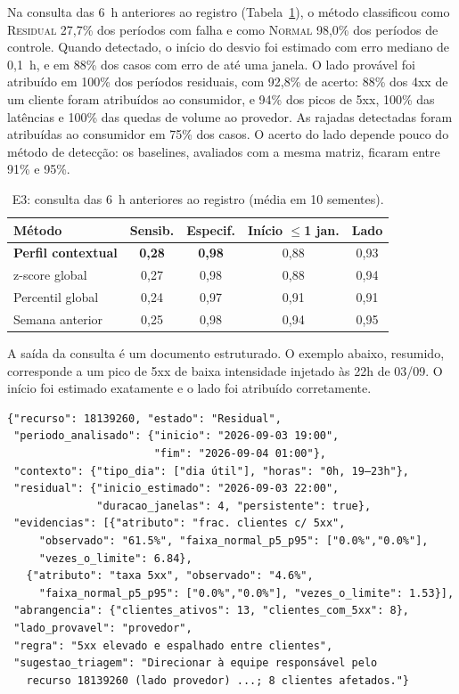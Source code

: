 \documentclass[sigconf,nonacm]{acmart}
\newcommand{\Normal}{\textsc{Normal}\xspace}
\newcommand{\Residual}{\textsc{Residual}\xspace}
\begin{document}
Na consulta das 6~h anteriores ao registro (Tabela~\ref{tab:consultas}), o método classificou como \Residual 27,7\% dos períodos com falha e como \Normal 98,0\% dos períodos de controle. Quando detectado, o início do desvio foi estimado com erro mediano de 0,1~h, e em 88\% dos casos com erro de até uma janela. O lado provável foi atribuído em 100\% dos períodos residuais, com 92,8\% de acerto: 88\% dos 4xx de um cliente foram atribuídos ao consumidor, e 94\% dos picos de 5xx, 100\% das latências e 100\% das quedas de volume ao provedor. As rajadas detectadas foram atribuídas ao consumidor em 75\% dos casos. O acerto do lado depende pouco do método de detecção: os baselines, avaliados com a mesma matriz, ficaram entre 91\% e 95\%.

\begin{table}[t]
  \caption{E3: consulta das 6~h anteriores ao registro (média em 10 sementes).}
  \label{tab:consultas}
  \small
  \begin{tabular}{lcccc}
    \toprule
    Método & Sensib. & Especif. & Início $\leq$1 jan. & Lado \\
    \midrule
    \textbf{Perfil contextual} & \textbf{0,28} & \textbf{0,98} & 0,88 & 0,93 \\
    z-score global & 0,27 & 0,98 & 0,88 & 0,94 \\
    Percentil global & 0,24 & 0,97 & 0,91 & 0,91 \\
    Semana anterior & 0,25 & 0,98 & 0,94 & 0,95 \\
    \bottomrule
  \end{tabular}
\end{table}

A saída da consulta é um documento estruturado. O exemplo abaixo, resumido, corresponde a um pico de 5xx de baixa intensidade injetado às 22h de 03/09. O início foi estimado exatamente e o lado foi atribuído corretamente.

\begin{Verbatim}[fontsize=\scriptsize,frame=single]
{"recurso": 18139260, "estado": "Residual",
 "periodo_analisado": {"inicio": "2026-09-03 19:00",
                       "fim": "2026-09-04 01:00"},
 "contexto": {"tipo_dia": ["dia útil"], "horas": "0h, 19–23h"},
 "residual": {"inicio_estimado": "2026-09-03 22:00",
              "duracao_janelas": 4, "persistente": true},
 "evidencias": [{"atributo": "frac. clientes c/ 5xx",
     "observado": "61.5%", "faixa_normal_p5_p95": ["0.0%","0.0%"],
     "vezes_o_limite": 6.84},
   {"atributo": "taxa 5xx", "observado": "4.6%",
     "faixa_normal_p5_p95": ["0.0%","0.0%"], "vezes_o_limite": 1.53}],
 "abrangencia": {"clientes_ativos": 13, "clientes_com_5xx": 8},
 "lado_provavel": "provedor",
 "regra": "5xx elevado e espalhado entre clientes",
 "sugestao_triagem": "Direcionar à equipe responsável pelo
   recurso 18139260 (lado provedor) ...; 8 clientes afetados."}
\end{Verbatim}
\end{document}
